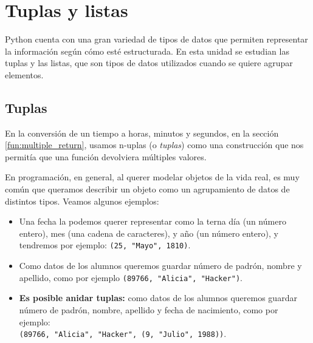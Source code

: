 
%

\chapter{Tuplas y listas}

Python cuenta con una gran variedad de tipos de datos que permiten
representar la información según cómo esté estructurada.  En esta unidad se
estudian las tuplas y las listas, que son tipos de datos utilizados cuando
se quiere agrupar elementos.

\section{Tuplas}

En la conversión de un tiempo a horas, minutos y segundos, en la sección
\ref{fun:multiple_return}, usamos n-uplas (o {\it tuplas}) como una
construcción que nos permitía que una función devolviera múltiples valores.

En programación, en general, al querer modelar objetos de la vida real, es
muy común que queramos describir un objeto como un agrupamiento de datos
de distintos tipos. Veamos algunos ejemplos:

\begin{itemize}

\item Una fecha la podemos querer representar como la terna día (un número
entero), mes (una cadena de caracteres), y año (un número entero), y
tendremos por ejemplo: \lstinline!(25, "Mayo", 1810)!.

\item Como datos de los alumnos queremos guardar número de padrón, nombre y
apellido, como por ejemplo \lstinline!(89766, "Alicia", "Hacker")!.

\item {\bf Es posible anidar tuplas:} como datos de los alumnos
queremos guardar número de padrón, nombre, apellido y fecha de nacimiento,
como por ejemplo: \\
\lstinline!(89766, "Alicia", "Hacker", (9, "Julio", 1988))!.
\end{itemize}

